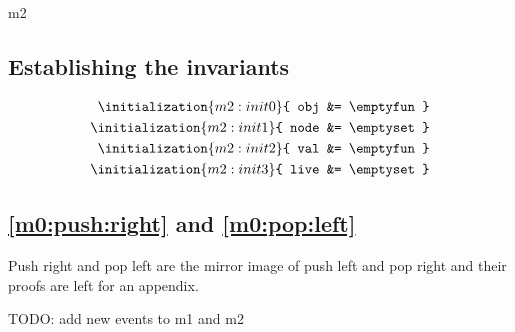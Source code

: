\documentclass[12pt]{amsart}
\begin{document}
\begin{machine}{m2}
\subsection{ Establishing the invariants }

\begin{align*}
	\initialization{m2:init0}{ obj &= \emptyfun }
\\	\initialization{m2:init1}{ node &= \emptyset }
\\  \initialization{m2:init2}{ val &= \emptyfun }
\\	\initialization{m2:init3}{ live &= \emptyset }
\end{align*}


\subsection{\ref{m0:push:right} and \ref{m0:pop:left}}
Push right and pop left are the mirror image of push left and pop right and their proofs are left for an appendix.

TODO: add new events to m1 and m2

\end{machine}



\end{document}
